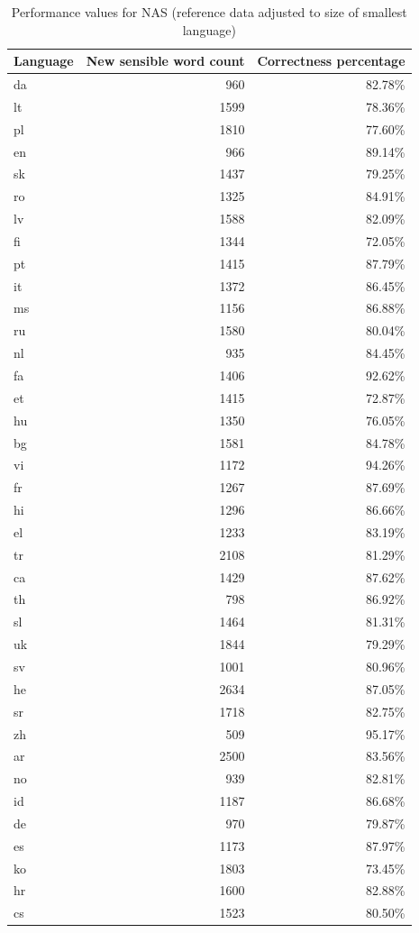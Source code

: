 \documentclass[11pt,a4paper,twoside,openright]{scrbook}
\begin{document}
\begin{table}[h]
\centering
\caption{Performance values for NAS (reference data adjusted to size of smallest language)}
\label{table:nas}
\begin{tabular}{lrr}
\textbf{Language} & \textbf{New sensible word count} & \textbf{Correctness percentage} \\ \hline \hline
da & 960 & 82.78\% \\ \hline
lt & 1599 & 78.36\% \\ \hline
pl & 1810 & 77.60\% \\ \hline
en & 966 & 89.14\% \\ \hline
sk & 1437 & 79.25\% \\ \hline
ro & 1325 & 84.91\% \\ \hline
lv & 1588 & 82.09\% \\ \hline
fi & 1344 & 72.05\% \\ \hline
pt & 1415 & 87.79\% \\ \hline
it & 1372 & 86.45\% \\ \hline
ms & 1156 & 86.88\% \\ \hline
ru & 1580 & 80.04\% \\ \hline
nl & 935 & 84.45\% \\ \hline
fa & 1406 & 92.62\% \\ \hline
et & 1415 & 72.87\% \\ \hline
hu & 1350 & 76.05\% \\ \hline
bg & 1581 & 84.78\% \\ \hline
vi & 1172 & 94.26\% \\ \hline
fr & 1267 & 87.69\% \\ \hline
hi & 1296 & 86.66\% \\ \hline
el & 1233 & 83.19\% \\ \hline
tr & 2108 & 81.29\% \\ \hline
ca & 1429 & 87.62\% \\ \hline
th & 798 & 86.92\% \\ \hline
sl & 1464 & 81.31\% \\ \hline
uk & 1844 & 79.29\% \\ \hline
sv & 1001 & 80.96\% \\ \hline
he & 2634 & 87.05\% \\ \hline
sr & 1718 & 82.75\% \\ \hline
zh & 509 & 95.17\% \\ \hline
ar & 2500 & 83.56\% \\ \hline
no & 939 & 82.81\% \\ \hline
id & 1187 & 86.68\% \\ \hline
de & 970 & 79.87\% \\ \hline
es & 1173 & 87.97\% \\ \hline
ko & 1803 & 73.45\% \\ \hline
hr & 1600 & 82.88\% \\ \hline
cs & 1523 & 80.50\% \\ 
\end{tabular}
\end{table}
\end{document}
